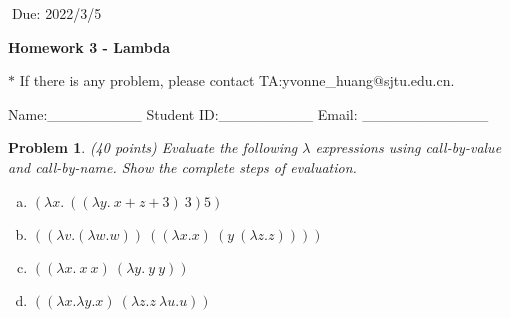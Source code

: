 \documentclass[12pt]{article}
\newtheorem{hw}{Problem}
\newenvironment{sol}
  {\par\vspace{3mm}\noindent{\it Solution}.}
  {\qed}
\begin{document}
$\;$\hfill Due: 2022/3/5

\begin{center}
{\LARGE\bf Homework 3 - Lambda}
\end{center}

\begin{center}
	\footnotesize{\color{red}$*$ If there is any problem, please contact TA:yvonne\_huang@sjtu.edu.cn.}
	
	\footnotesize{\color{blue} \quad Name:\_\_\_\_\_\_\_\_\_  \quad Student ID:\_\_\_\_\_\_\_\_\_ \quad Email: \_\_\_\_\_\_\_\_\_\_\_\_}
\end{center}

\begin{hw}\rm (40 points)
	Evaluate the following $\lambda$ expressions using call-by-value and call-by-name. Show the complete steps of evaluation.
	\begin{enumerate}[(a)]
		\item $(\lambda x.\ ((\lambda y.\ x+z+3 )\ 3 )5)$
		\item $((\lambda v.(\lambda w.w))\ ((\lambda x.x)\ (y\ (\lambda z.z))))$
		\item $((\lambda x.\ x\ x)\ (\lambda y.\ y\ y))$
		\item $((\lambda x. \lambda y. x)\ (\lambda z.z\ \lambda u.u))$
	\end{enumerate}
\end{hw}

\end{document}
